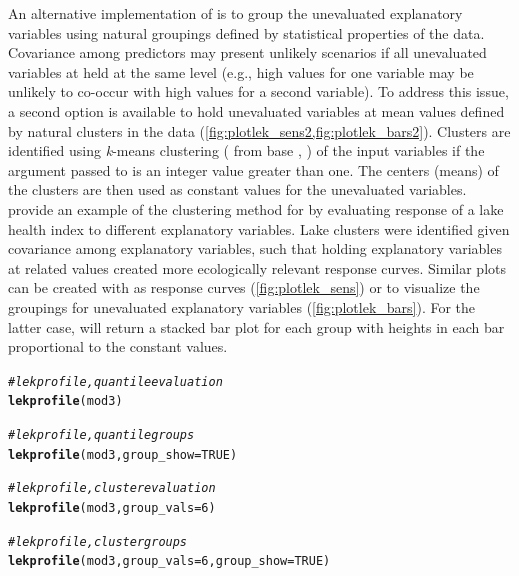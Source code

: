 \documentclass[article,shortnames]{jss}\usepackage[]{graphicx}\usepackage[]{color}
\makeatletter
\newcommand{\hlnum}[1]{\textcolor[rgb]{0.686,0.059,0.569}{#1}}%
\newcommand{\hlcom}[1]{\textcolor[rgb]{0.678,0.584,0.686}{\textit{#1}}}%
\newcommand{\hlstd}[1]{\textcolor[rgb]{0.345,0.345,0.345}{#1}}%
\newcommand{\hlkwc}[1]{\textcolor[rgb]{0.333,0.667,0.333}{#1}}%
\newcommand{\hlkwd}[1]{\textcolor[rgb]{0.737,0.353,0.396}{\textbf{#1}}}%
\newenvironment{kframe}{%
 \def\at@end@of@kframe{}%
 \ifinner\ifhmode%
  \def\at@end@of@kframe{\end{minipage}}%
  \begin{minipage}{\columnwidth}%
 \fi\fi%
 \def\FrameCommand##1{\hskip\@totalleftmargin \hskip-\fboxsep
 \colorbox{shadecolor}{##1}\hskip-\fboxsep
     \hskip-\linewidth \hskip-\@totalleftmargin \hskip\columnwidth}%
 \MakeFramed {\advance\hsize-\width
   \@totalleftmargin\z@ \linewidth\hsize
   \@setminipage}}%
 {\par\unskip\endMakeFramed%
 \at@end@of@kframe}
\makeatother
\begin{document}
An alternative implementation of  is to group the unevaluated explanatory variables using natural groupings defined by statistical properties of the data. Covariance among predictors may present unlikely scenarios if all unevaluated variables at held at the same level (e.g., high values for one variable may be unlikely to co-occur with high values for a second variable). To address this issue, a second option is available to hold unevaluated variables at mean values defined by natural clusters in the data (\cref{fig:plotlek_sens2,fig:plotlek_bars2}). Clusters are identified using {\it k}-means clustering ( from base , \citealt{Hartigan79}) of the input variables if the argument passed to  is an integer value greater than one. The centers (means) of the clusters are then used as constant values for the unevaluated variables.  \citet{Beck14a} provide an example of the clustering method for  by evaluating response of a lake health index to different explanatory variables.  Lake clusters were identified given covariance among explanatory variables, such that holding explanatory variables at related values created more ecologically relevant response curves.  Similar plots can be created with  as response curves (\cref{fig:plotlek_sens}) or to visualize the groupings for unevaluated explanatory variables (\cref{fig:plotlek_bars}).  For the latter case,  will return a stacked bar plot for each group with heights in each bar proportional to the constant values.
\begin{kframe}
\begin{alltt}
\hlcom{# lek profile, quantile evaluation}
\hlkwd{lekprofile}\hlstd{(mod3)}

\hlcom{# lek profile, quantile groups }
\hlkwd{lekprofile}\hlstd{(mod3,} \hlkwc{group_show} \hlstd{=} \hlnum{TRUE}\hlstd{)}

\hlcom{# lek profile, cluster evaluation}
\hlkwd{lekprofile}\hlstd{(mod3,} \hlkwc{group_vals} \hlstd{=} \hlnum{6}\hlstd{)}

\hlcom{# lek profile, cluster groups}
\hlkwd{lekprofile}\hlstd{(mod3,} \hlkwc{group_vals} \hlstd{=} \hlnum{6}\hlstd{,} \hlkwc{group_show} \hlstd{=} \hlnum{TRUE}\hlstd{)}
\end{alltt}
\end{kframe}
\end{document}
